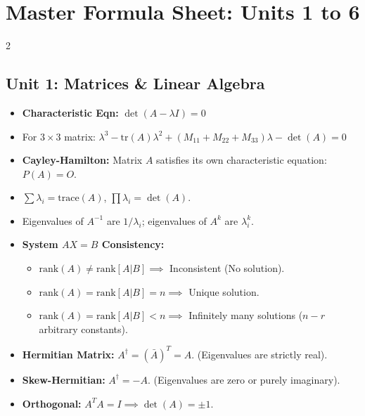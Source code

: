 \chapter*{Master Formula Sheet: Units 1 to 6}

\begin{multicols}{2}
{\small
\section*{Unit 1: Matrices \& Linear Algebra}
\begin{itemize}[leftmargin=*]
    \item \textbf{Characteristic Eqn:} $\det(A - \lambda I) = 0$
    \item For $3\times 3$ matrix:
    $\lambda^3 - \text{tr}(A)\lambda^2 + (M_{11}+M_{22}+M_{33})\lambda - \det(A) = 0$
    \item \textbf{Cayley-Hamilton:} Matrix $A$ satisfies its own characteristic equation: $P(A) = O$.
    \item $\sum \lambda_i = \text{trace}(A)$, $\prod \lambda_i = \det(A)$.
    \item Eigenvalues of $A^{-1}$ are $1/\lambda_i$; eigenvalues of $A^k$ are $\lambda_i^k$.
    \item \textbf{System $AX=B$ Consistency:}
    \begin{itemize}
        \item $\text{rank}(A) \neq \text{rank}[A|B] \implies$ Inconsistent (No solution).
        \item $\text{rank}(A) = \text{rank}[A|B] = n \implies$ Unique solution.
        \item $\text{rank}(A) = \text{rank}[A|B] < n \implies$ Infinitely many solutions ($n-r$ arbitrary constants).
    \end{itemize}
    \item \textbf{Hermitian Matrix:} $A^\dagger = (\bar{A})^T = A$. (Eigenvalues are strictly real).
    \item \textbf{Skew-Hermitian:} $A^\dagger = -A$. (Eigenvalues are zero or purely imaginary).
    \item \textbf{Orthogonal:} $A^T A = I \implies \det(A) = \pm 1$.
\end{itemize}

}
\end{multicols}
